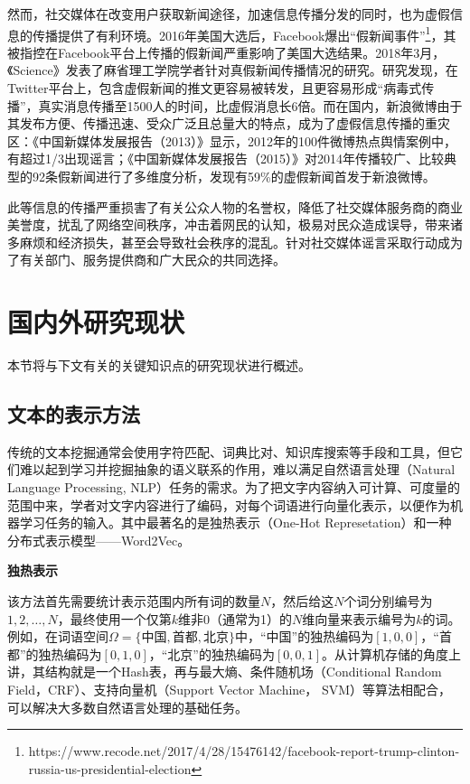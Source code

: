 \documentclass[a4paper,oneside,12pt]{book}
\begin{document}
然而，社交媒体在改变用户获取新闻途径，加速信息传播分发的同时，也为虚假信息的传播提供了有利环境。2016年美国大选后，Facebook爆出“假新闻事件”\footnote{https://www.recode.net/2017/4/28/15476142/facebook-report-trump-clinton-russia-us-presidential-election}，其被指控在Facebook平台上传播的假新闻严重影响了美国大选结果。2018年3月，《Science》发表了麻省理工学院学者针对真假新闻传播情况的研究\cite{false_news_spread_2018}。研究发现，在Twitter平台上，包含虚假新闻的推文更容易被转发，且更容易形成“病毒式传播”，真实消息传播至1500人的时间，比虚假消息长6倍。而在国内，新浪微博由于其发布方便、传播迅速、受众广泛且总量大的特点，成为了虚假信息传播的重灾区：《中国新媒体发展报告（2013）》\cite{唐绪军2013中国新媒体发展报告}显示，2012年的100件微博热点舆情案例中，有超过1/3出现谣言；《中国新媒体发展报告（2015）》\cite{唐绪军2015中国新媒体发展报告}对2014年传播较广、比较典型的92条假新闻进行了多维度分析，发现有59\%的虚假新闻首发于新浪微博。

此等信息的传播严重损害了有关公众人物的名誉权，降低了社交媒体服务商的商业美誉度，扰乱了网络空间秩序，冲击着网民的认知，极易对民众造成误导，带来诸多麻烦和经济损失，甚至会导致社会秩序的混乱。针对社交媒体谣言采取行动成为了有关部门、服务提供商和广大民众的共同选择。\cite{周兴2017基于深度学习的谣言检测及模式挖掘}

\section{国内外研究现状}
本节将与下文有关的关键知识点的研究现状进行概述。
\subsection{文本的表示方法}
传统的文本挖掘通常会使用字符匹配、词典比对、知识库搜索等手段和工具，但它们难以起到学习并挖掘抽象的语义联系的作用，难以满足自然语言处理（Natural Language Processing, NLP）任务的需求。为了把文字内容纳入可计算、可度量的范围中来，学者对文字内容进行了编码，对每个词语进行向量化表示，以便作为机器学习任务的输入。其中最著名的是独热表示（One-Hot Represetation）和一种分布式表示模型——Word2Vec。

\textbf{独热表示}

该方法首先需要统计表示范围内所有词的数量$N$，然后给这$N$个词分别编号为$1,2,\ldots,N$，最终使用一个仅第$k$维非0（通常为1）的$N$维向量来表示编号为$k$的词。例如，在词语空间$\Omega=\{\mbox{中国}, \mbox{首都}, \mbox{北京}\}$中，“中国”的独热编码为$[1,0,0]$，“首都”的独热编码为$[0,1,0]$，“北京”的独热编码为$[0,0,1]$。从计算机存储的角度上讲，其结构就是一个Hash表，再与最大熵、条件随机场（Conditional Random Field，CRF）、支持向量机（Support Vector Machine， SVM）等算法相配合，可以解决大多数自然语言处理的基础任务。
\end{document}
